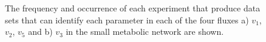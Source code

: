 \documentclass[10pt]{article}
\begin{document}
	\begin{figure}[!tbhp]
		\caption{The frequency and occurrence of each experiment that produce data sets that can identify each parameter in each of the four fluxes a) $v_1$, $v_2$, $v_5$ and b) $v_3$ in the small metabolic network are shown.}\label{fig:ident-expt}
	\end{figure}	
	
	
	
\end{document}
